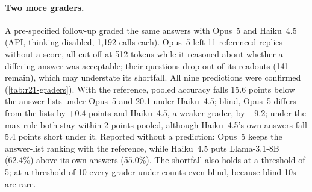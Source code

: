\paragraph{Two more graders.}
A pre-specified follow-up graded the same answers with Opus~5 and Haiku~4.5 (API, thinking disabled, 1,192 calls each). Opus~5 left 11 referenced replies without a score, all cut off at 512 tokens while it reasoned about whether a differing answer was acceptable; their questions drop out of its readouts (141 remain), which may understate its shortfall. All nine predictions were confirmed (\cref{tab:r21-graders}). With the reference, pooled accuracy falls 15.6 points below the answer lists under Opus~5 and 20.1 under Haiku~4.5; blind, Opus~5 differs from the lists by $+0.4$ points and Haiku~4.5, a weaker grader, by $-9.2$; under the max rule both stay within 2 points pooled, although Haiku~4.5's own answers fall 5.4 points short under it. Reported without a prediction: Opus~5 keeps the answer-list ranking with the reference, while Haiku~4.5 puts Llama-3.1-8B (62.4\%) above its own answers (55.0\%). The shortfall also holds at a threshold of 5; at a threshold of 10 every grader under-counts even blind, because blind 10s are rare.

\begin{table}[htbp]
\centering
\caption{The benchmark study under three graders: pooled changes against the answer lists (points, 95\% CI) at score thresholds 5, 7, and 10, the max rule at 7, and the shares of correct non-matching answers scored 3 or below, blind and with the reference. For Opus~5 and Haiku~4.5, threshold 7 and the max rule carry registered predictions and thresholds 5 and 10 are registered readouts; Sonnet~5's thresholds 5 and 10 and its max rule are post hoc.}
\label{tab:r21-graders}
\footnotesize

\end{table}

